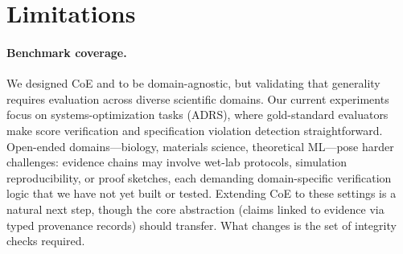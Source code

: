 \section{Limitations}
\label{sec:limitations}

\paragraph{Benchmark coverage.}
We designed CoE and \coeaudit{} to be domain-agnostic, but validating that generality requires evaluation across diverse scientific domains.
Our current experiments focus on systems-optimization tasks (ADRS), where gold-standard evaluators make score verification and specification violation detection straightforward.
Open-ended domains---biology, materials science, theoretical ML---pose harder challenges: evidence chains may involve wet-lab protocols, simulation reproducibility, or proof sketches, each demanding domain-specific verification logic that we have not yet built or tested.
Extending CoE to these settings is a natural next step, though the core abstraction (claims linked to evidence via typed provenance records) should transfer. What changes is the set of integrity checks required.


